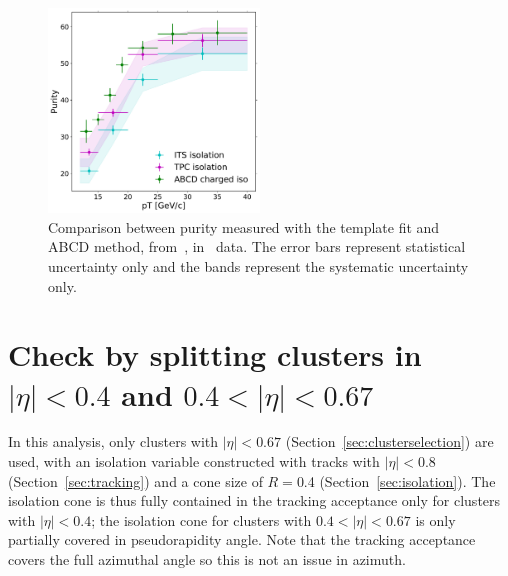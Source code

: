 
\begin{figure}[h]
\center
\includegraphics[width=0.5\textwidth]{Checks_Systematics/ABCDcomparison.pdf}
\caption{Comparison between purity measured with the template fit and ABCD method, from~\cite{Erwann}, in \pPb~data. The error bars represent statistical uncertainty only and the bands represent the systematic uncertainty only.}
\label{fig:ComparisonToErwanns}
\end{figure}



\section{Check by splitting clusters in $|\eta|<0.4$ and $0.4<|\eta|<0.67$ }
\label{sec:iso_acceptance_check}

In this analysis, only clusters with $|\eta|<0.67$ (Section~\ref{sec:clusterselection}) are used, with an isolation variable constructed with tracks with $|\eta|<0.8$ (Section~\ref{sec:tracking}) and a cone size of $R=$0.4 (Section~\ref{sec:isolation}). The isolation cone is thus fully contained in the tracking acceptance only for clusters with $|\eta|<0.4$; the isolation cone for clusters with $0.4<|\eta|<0.67$ is only partially covered in pseudorapidity angle. Note that the tracking acceptance covers the full azimuthal angle so this is not an issue in azimuth. 

